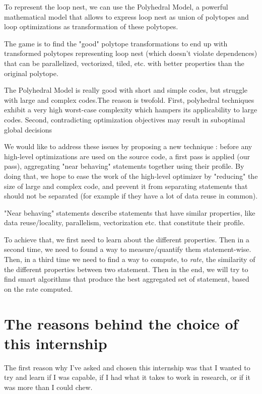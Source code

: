 \documentclass[paper=a4, fontsize=11pt]{scrartcl}
\numberwithin{equation}{section}        %
\numberwithin{figure}{section}          %
\numberwithin{table}{section}               %
\begin{document}
To represent the loop nest, we can use the Polyhedral Model, a powerful mathematical model
that allows to express loop nest as union of polytopes and loop optimizations as
transformation of these polytopes.

The game is to find the "good" polytope transformations to end up with
transformed polytopes representing loop nest (which doesn't violate dependences) 
that can be parallelized, vectorized, tiled, etc. with better properties than the original
polytope.

The Polyhedral Model is really good with short and simple codes, but struggle with
large and complex codes.The reason is twofold. First, polyhedral techniques exhibit
a very high worst-case complexity which hampers its applicability to large codes.
Second, contradicting optimization objectives may result in suboptimal global
decisions


We would like to address these issues by proposing a new technique : before any
high-level optimizations are used on the source code, a first pass is applied (our pass),
aggregating "near behaving" statements together using their profile.
By doing that, we hope to ease the work of the high-level optimizer by "reducing" the size
of large and complex code, and prevent it from separating statements that should
not be separated (for example if they have a lot of data reuse in common).

"Near behaving" statements describe statements that have similar properties,
like data reuse/locality, parallelism, vectorization etc. that constitute their profile.

To achieve that, we first need to learn about the different properties. Then in a second
time, we need to found a way to measure/quantify them statement-wise. Then, in a third
time we need to find a way to compute, to \textit{rate}, the similarity of the different
properties between two statement. Then in the end, we will try to find smart algorithms
that produce the best aggregated set of statement, based on the rate computed.

\section{The reasons behind the choice of this internship}
The first reason why I've asked and chosen this internship was that I wanted to try and learn
if I was capable, if I had what it takes to work in research, or if it was more than I could
chew.
\end{document}
